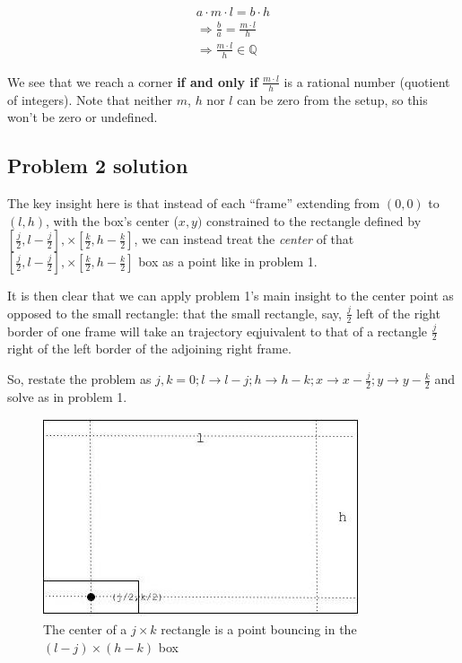\documentclass[11pt, oneside]{article} 	%
\begin{document}
\begin{align}
a \cdot m \cdot l = b \cdot h \\
\Rightarrow \frac{b}{a} = \frac{m \cdot l}{h} \\ 
\Rightarrow \frac{m \cdot l}{h} \in \mathbb{Q} 
\end{align}

We see that we reach a corner \textbf{if and only if} $\frac{m \cdot l}{h}$ is a rational number (quotient of integers).  Note that neither $m$, $h$ nor $l$ can be zero from the setup, so this won't be zero or undefined.



\subsection{Problem 2 solution}

The key insight here is that instead of each ``frame'' extending from $(0, 0)$ to $(l, h)$, with the box's center ($x, y)$ constrained to the rectangle defined by $[\frac{j}{2}, l - \frac{j}{2}], \times [\frac{k}{2}, h - \frac{k}{2}]$, we can instead treat the \emph{center} of that $[\frac{j}{2}, l - \frac{j}{2}], \times [\frac{k}{2}, h - \frac{k}{2}]$ box as a point like in problem 1. 

It is then clear that we can apply problem 1's main insight to the center point as opposed to the small rectangle: that the small rectangle, say, $\frac{j}{2}$ left of the right border of one frame will take an trajectory eqjuivalent to that of a rectangle $\frac{j}{2}$ right of the left border of the adjoining right frame.

So, restate the problem as $j, k = 0; l \rightarrow l - j; h \rightarrow h - k;  x \rightarrow x - \frac{j}{2}; y \rightarrow y - \frac{k}{2}$ and solve as in problem 1.

\begin{figure}[!htb]
\centering
\includegraphics[scale=.4]{problem2}
\caption{The center of a $j \times k$ rectangle is a point bouncing in the $(l - j) \times (h - k)$ box}
\end{figure}
\end{document}
